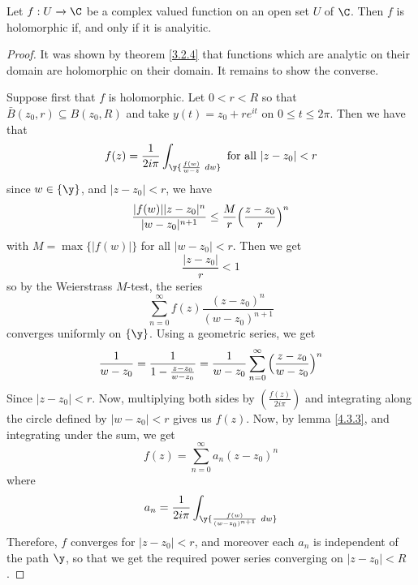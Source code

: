 \begin{theorem}\label{4.3.4}
    Let $f:U \xrightarrow{} \C$ be a complex valued function on an open set $U$
    of $\C$. Then  $f$ is holomorphic if, and only if it is analyitic.
\end{theorem}
\begin{proof}
    It was shown by theorem \ref{3.2.4} that functions which are analytic on
    their domain are holomorphic on their domain. It remains to show the
    converse.

    Suppose first that $f$ is holomorphic. Let $0<r<R$ so that  $\bar{B}(z_0,r)
    \subseteq B(z_0,R)$ and take $y(t)=z_0+re^{it}$ on $0 \leq t \leq 2\pi$.
    Then we have that
    \begin{equation*}
        f(z)=\frac{1}{2i\pi}\int_\y{\frac{f(w)}{w-z} \ dw} \text{ for all }
        |z-z_0|<r
    \end{equation*}
    since $w \in \{\y\}$, and $|z-z_0|<r$, we have
    \begin{equation*}
        \frac{|f(w)||z-z_0|^n}{|w-z_0|^{n+1}} \leq
        \frac{M}{r}\Big{(} \frac{z-z_0}{r} \Big{)}^n
    \end{equation*}
    with $M=\max{\{|f(w)|\}}$ for all $|w-z_0|<r$. Then we get
    \begin{equation*}
        \frac{|z-z_0|}{r}<1
    \end{equation*}
    so by the Weierstrass $M$-test, the series
    \begin{equation*}
        \sum_{n=0}^\infty{f(z)\frac{(z-z_0)^n}{(w-z_0)^{n+1}}}
    \end{equation*}
    converges uniformly on $\{\y\}$. Using a geometric series, we get
    \begin{equation*}
        \frac{1}{w-z_0}=\frac{1}{1-\frac{z-z_0}{w-z_0}}=
        \frac{1}{w-z_0}\sum_{n=0}^\infty{\Big{(} \frac{z-z_0}{w-z_0} \Big{)}^n}
    \end{equation*}
    Since $|z-z_0|<r$. Now, multiplying both sides by $(\frac{f(z)}{2i\pi})$ and
    integrating along the circle defined by $|w-z_0|<r$ gives us $f(z)$. Now, by
    lemma \ref{4.3.3}, and integrating under the sum, we get
    \begin{equation*}
        f(z)=\sum_{n=0}^\infty{a_n(z-z_0)^n}
    \end{equation*}
    where
    \begin{equation*}
        a_n=\frac{1}{2i\pi}\int_\y{\frac{f(w)}{(w-z_0)^{n+1}} \ dw}
    \end{equation*}
    Therefore, $f$ converges for  $|z-z_0|<r$, and moreover each $a_n$ is
    independent of the path $\y$, so that we get the required power series
    converging on  $|z-z_0|<R$.
\end{proof}
